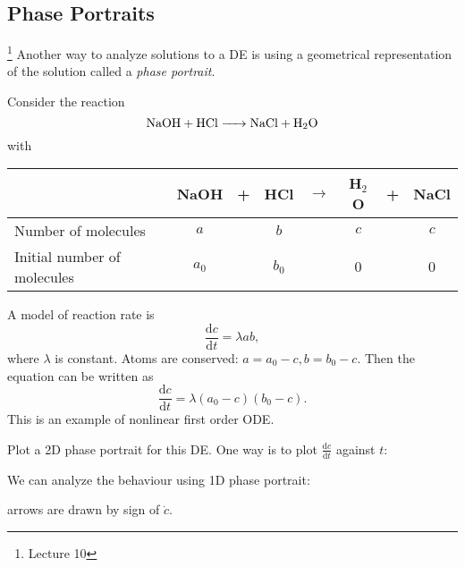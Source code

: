 \documentclass[a4paper]{article}
\begin{document}
    \subsection{Phase Portraits}\footnote{Lecture 10}
    Another way to analyze solutions to a DE is using a geometrical representation of the solution called a \textit{phase portrait}.
    \begin{example}
        Consider the reaction
        \[
            \ce{NaOH + HCl -> NaCl + H_2O}
        \]
        with 
        \begin{center}
            \begin{tabular}{lccccccc}
              \toprule
              & NaOH & + & HCl & $\rightarrow$ & H$_2$O & + & NaCl \\
              \midrule
              Number of molecules & $a$ & & $b$ & & $c$ & & $c$ \\
              Initial number of molecules & $a_0$ & & $b_0$ & & $0$ & & $0$ \\
              \bottomrule
            \end{tabular}
          \end{center}
          A model of reaction rate is 
          \[
              \frac{\mathrm{d}c}{\mathrm{d}t}=\lambda ab 
          ,\]
          where $ \lambda $ is constant. Atoms are conserved: $ a=a_0-c, b=b_0-c $. Then the equation can be written as 
          \[
              \frac{\mathrm{d}c}{\mathrm{d}t}=\lambda(a_0-c)(b_0-c) 
          .\]
          This is an example of nonlinear first order ODE.

          Plot a 2D phase portrait for this DE. One way is to plot $ \frac{\mathrm{d}c}{\mathrm{d}t}  $ against $t$:
          \begin{center}
          \end{center}
          We can analyze the behaviour using 1D phase portrait:
          \begin{center}
          \end{center}
          arrows are drawn by sign of $ \dot{c} $.
    \end{example}
\end{document}
